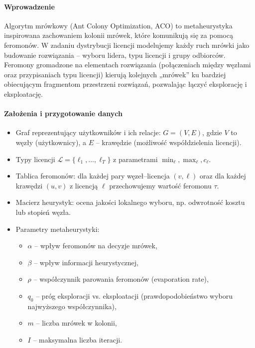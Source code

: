 \paragraph{Wprowadzenie}  
Algorytm mrówkowy (Ant Colony Optimization, ACO) to metaheurystyka inspirowana zachowaniem kolonii mrówek, które komunikują się za pomocą feromonów. W zadaniu dystrybucji licencji modelujemy każdy ruch mrówki jako budowanie rozwiązania – wyboru lidera, typu licencji i grupy odbiorców. Feromony gromadzone na elementach rozwiązania (połączeniach między węzłami oraz przypisaniach typu licencji) kierują kolejnych „mrówek” ku bardziej obiecującym fragmentom przestrzeni rozwiązań, pozwalając łączyć eksplorację i eksploatację.

\paragraph{Założenia i przygotowanie danych}  
\begin{itemize}
  \item Graf reprezentujący użytkowników i ich relacje: $G=(V,E)$, gdzie $V$ to węzły (użytkownicy), a $E$ – krawędzie (możliwość współdzielenia licencji).
  \item Typy licencji $\mathcal{L}=\{\ell_1,\dots,\ell_T\}$ z parametrami $\min_\ell,\max_\ell,c_\ell$.
  \item Tablica feromonów: dla każdej pary węzeł–licencja $(v,\ell)$ oraz dla każdej krawędzi $(u,v)$ z licencją $\ell$ przechowujemy wartość feromonu $\tau$.
  \item Macierz heurystyk: ocena jakości lokalnego wyboru, np. odwrotność kosztu lub stopień węzła.
  \item Parametry metaheurystyki:
    \begin{itemize}
      \item $\alpha$ – wpływ feromonów na decyzje mrówek,
      \item $\beta$ – wpływ informacji heurystycznej,
      \item $\rho$ – współczynnik parowania feromonów (evaporation rate),
      \item $q_0$ – próg eksploracji vs. eksploatacji (prawdopodobieństwo wyboru najwyższego współczynnika),
      \item $m$ – liczba mrówek w kolonii,
      \item $I$ – maksymalna liczba iteracji.
    \end{itemize}
\end{itemize}

